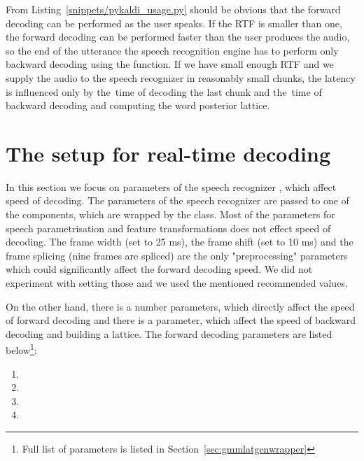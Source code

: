 
From Listing~\ref{snippets/pykaldi_usage.py} should be obvious that 
the forward decoding can be performed as the user speaks.
If the \ac{RTF} is smaller than one, the forward decoding can be performed faster
than the user produces the audio, so the end of the utterance
the speech recognition engine has to perform only backward decoding using 
the \/ function.
If we have small enough \ac{RTF} and we supply the audio to the speech recognizer
in reasonably small chunks, the latency is influenced only by the~time of decoding the last chunk
and the~time of backward decoding and computing the word posterior lattice.

\section{The setup for real-time decoding}
\label{sec:real-setup}

In this section we focus on parameters of the speech recognizer \/,
which affect speed of decoding.
The parameters of the speech recognizer are passed to one of the components,
which are wrapped by the \/ class.
Most of the parameters for speech parametrisation and feature transformations 
does not effect speed of decoding. 
The frame width (set to 25 ms), the frame shift (set to 10 ms) and
the frame splicing (nine frames are spliced) 
are the only "preprocessing" parameters which could significantly affect the forward decoding speed.
We did not experiment with setting those and we used the mentioned recommended values.

On the other hand, there is a number \/ parameters,
which directly affect the speed of forward decoding and there is a \/ parameter,
which affect the speed of backward decoding and building a lattice.
The forward decoding parameters are listed below\footnote{Full list of parameters is listed in Section~\ref{sec:gmmlatgenwrapper}}:
\begin{enumerate}
    \item {} 
    \item {} 
    \item {} 
    \item {} 
\end{enumerate}

